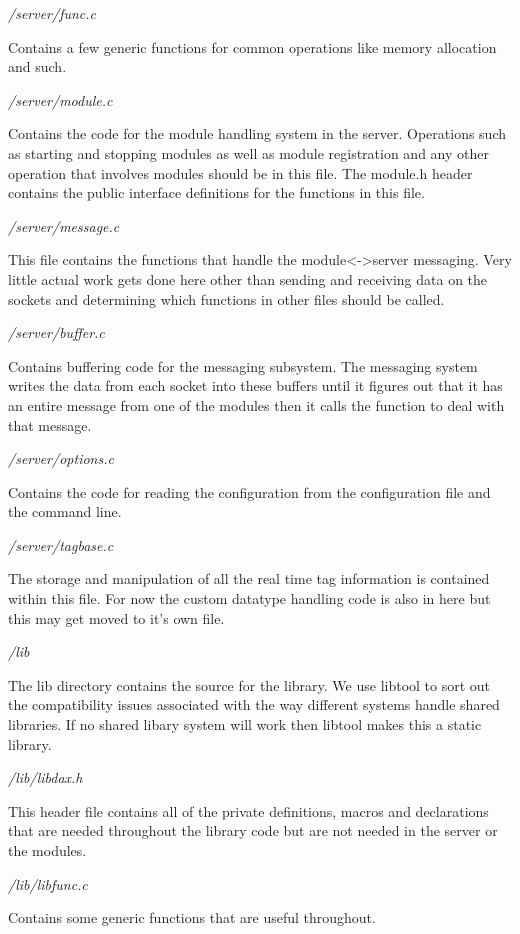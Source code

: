 \emph{/server/func.c}

Contains a few generic functions for common operations like memory allocation and such.

\emph{/server/module.c}

Contains the code for the module handling system in the server. Operations such as starting and stopping modules as well as module registration and any other operation that involves modules should be in this file. The module.h header contains the public interface definitions for the functions in this file.

\emph{/server/message.c}

This file contains the functions that handle the module<->server messaging. Very little actual work gets done here other than sending and receiving data on the sockets and determining which functions in other files should be called.

\emph{/server/buffer.c}

Contains buffering code for the messaging subsystem. The messaging system writes the data from each socket into these buffers until it figures out that it has an entire message from one of the modules then it calls the function to deal with that message.

\emph{/server/options.c}

Contains the code for reading the configuration from the configuration file and the command line.

\emph{/server/tagbase.c}

The storage and manipulation of all the real time tag information is contained within this file. For now the custom datatype handling code is also in here but this may get moved to it's own file.

\emph{/lib}

The lib directory contains the source for the library. We use libtool to sort out the compatibility issues associated with the way different systems handle shared libraries. If no shared libary system will work then libtool makes this a static library.

\emph{/lib/libdax.h}

This header file contains all of the private definitions, macros and declarations that are needed throughout the library code but are not needed in the server or the modules.

\emph{/lib/libfunc.c}

Contains some generic functions that are useful throughout.

